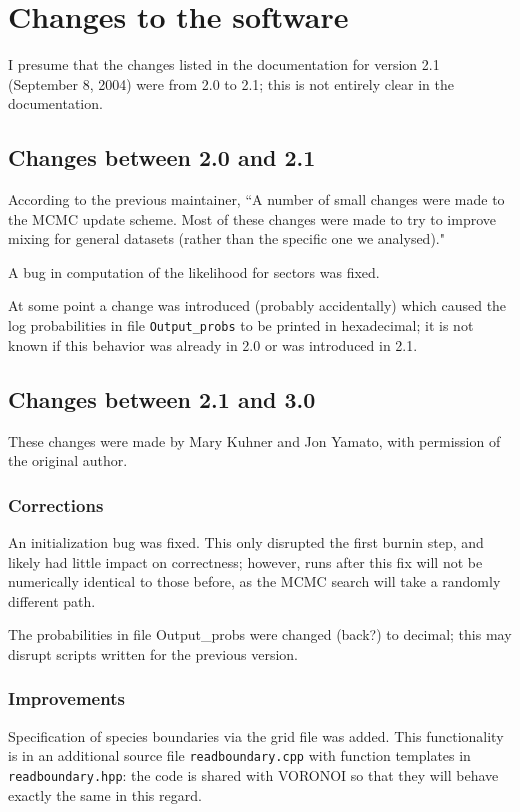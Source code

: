 \documentclass[10pt,titlepage,times,letterpaper]{article}
\begin{document}
\section{Changes to the software} 

I presume that the changes listed in the documentation for version 2.1
(September 8, 2004) were from 2.0 to 2.1; this is not entirely clear in
the documentation.

\subsection{Changes between 2.0 and 2.1}

According to the previous maintainer, ``A number of small changes were made to the MCMC update scheme.
Most of these changes were made to try to
improve mixing for general datasets (rather than the specific one we
analysed)."  

A bug in computation of the likelihood for sectors was fixed.

At some point a change was introduced (probably accidentally) which caused the log probabilities
in file {\tt Output\_probs} to be printed in hexadecimal; it is not known
if this behavior was already in 2.0 or was introduced in 2.1.

\subsection{Changes between 2.1 and 3.0}

These changes were made by Mary Kuhner and Jon Yamato, with permission of the
original author.

\subsubsection{Corrections}
An initialization bug was fixed.  This only disrupted
the first burnin step, and likely had little impact on correctness; however,
runs after this fix will not be numerically identical to those before,
as the MCMC search will take a randomly different path.

The probabilities in file Output\_probs were
changed (back?) to decimal; this may disrupt scripts written for the previous
version. 

\subsubsection{Improvements}
Specification of species boundaries via the grid file was added.  This
functionality is in an additional source file {\tt readboundary.cpp}
with function templates in {\tt readboundary.hpp}:  the code is shared
with VORONOI so that they will behave exactly the same in this regard.
\end{document}
